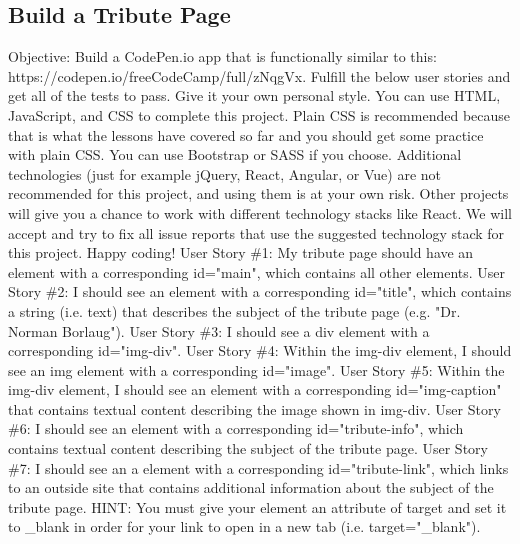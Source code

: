 \documentclass{article}%
\begin{document}
\subsection{Build a Tribute Page}%
\label{subsec:BuildaTributePage}%
Objective: Build a CodePen.io app that is functionally similar to this: https://codepen.io/freeCodeCamp/full/zNqgVx.\newline%
Fulfill the below user stories and get all of the tests to pass. Give it your own personal style.\newline%
You can use HTML, JavaScript, and CSS to complete this project. Plain CSS is recommended because that is what the lessons have covered so far and you should get some practice with plain CSS. You can use Bootstrap or SASS if you choose. Additional technologies (just for example jQuery, React, Angular, or Vue) are not recommended for this project, and using them is at your own risk. Other projects will give you a chance to work with different technology stacks like React. We will accept and try to fix all issue reports that use the suggested technology stack for this project. Happy coding!\newline%
User Story \#1: My tribute page should have an element with a corresponding id="main", which contains all other elements.\newline%
User Story \#2: I should see an element with a corresponding id="title", which contains a string (i.e. text) that describes the subject of the tribute page (e.g. "Dr. Norman Borlaug").\newline%
User Story \#3: I should see a div element with a corresponding id="img{-}div".\newline%
User Story \#4: Within the img{-}div element, I should see an img element with a corresponding id="image".\newline%
User Story \#5: Within the img{-}div element, I should see an element with a corresponding id="img{-}caption" that contains textual content describing the image shown in img{-}div.\newline%
User Story \#6: I should see an element with a corresponding id="tribute{-}info", which contains textual content describing the subject of the tribute page.\newline%
User Story \#7: I  should see an a element with a corresponding id="tribute{-}link", which links to an outside site that contains additional information about the subject of the tribute page. HINT: You must give your element an attribute of target and set it to \_blank in order for your link to open in a new tab (i.e. target="\_blank").\newline%
\end{document}
